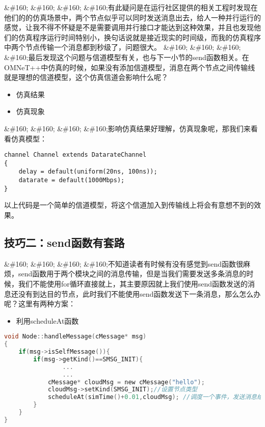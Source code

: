 \&\#160; \&\#160; \&\#160; \&\#160;有此疑问是在运行社区提供的相关工程时发现在他们的的仿真场景中，两个节点似乎可以同时发送消息出去，给人一种并行运行的感觉，让我不得不怀疑是不是需要调用并行接口才能达到这种效果，并且也发现他们的仿真程序运行时间特别小，换句话说就是接近现实的时间级，而我的仿真程序中两个节点传输一个消息都到秒级了，问题很大。
\&\#160; \&\#160; \&\#160; \&\#160;最后发现这个问题与信道模型有关，也与下一小节的send函数相关。在OMNeT++中仿真的时候，如果没有添加信道模型，消息在两个节点之间传输线就是理想的信道模型，这个仿真信道会影响什么呢？

\begin{itemize}
\item 仿真结果

\item 仿真现象

\end{itemize}

\&\#160; \&\#160; \&\#160; \&\#160;影响仿真结果好理解，仿真现象呢，那我们来看看仿真模型：

\begin{verbatim}
channel Channel extends DatarateChannel
{
    delay = default(uniform(20ns, 100ns));
    datarate = default(1000Mbps);
}
\end{verbatim}

以上代码是一个简单的信道模型，将这个信道加入到传输线上将会有意想不到的效果。

\subsection{技巧二：send函数有套路}
\label{技巧二：send函数有套路}

\&\#160; \&\#160; \&\#160; \&\#160;不知道读者有时候有没有感觉到send函数很麻烦，send函数用于两个模块之间的消息传输，但是当我们需要发送多条消息的时候，我们不能使用for循环直接就上，其主要原因就上我们使用send函数发送的消息还没有到达目的节点，此时我们不能使用send函数发送下一条消息，那么怎么办呢？这里有两种方案：

\begin{itemize}
\item 利用scheduleAt函数

\end{itemize}

\begin{lstlisting}[language=c,caption=My]
void Node::handleMessage(cMessage* msg)
{
    if(msg->isSelfMessage()){
        if(msg->getKind()==SMSG_INIT){
                ...
                ...
            cMessage* cloudMsg = new cMessage("hello");
            cloudMsg->setKind(SMSG_INIT);//设置节点类型
            scheduleAt(simTime()+0.01,cloudMsg); //调度一个事件，发送消息给自己
        }
    }
}
\end{lstlisting}

